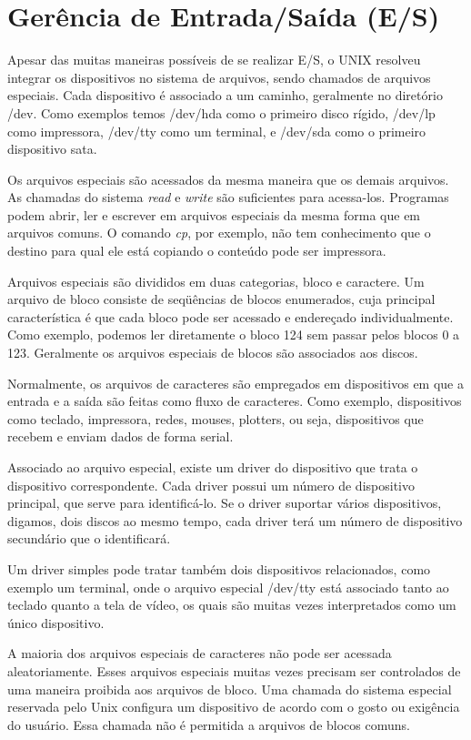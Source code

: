 \chapter{Gerência de Entrada/Saída (E/S)}

Apesar das muitas maneiras possíveis de se realizar E/S, o UNIX resolveu integrar os dispositivos no sistema de arquivos, sendo chamados de arquivos especiais. Cada dispositivo é associado a um caminho, geralmente no diretório /dev. Como exemplos temos /dev/hda como o primeiro disco rígido, /dev/lp como impressora, /dev/tty como um terminal, e /dev/sda como o primeiro dispositivo sata.

Os arquivos especiais são acessados da mesma maneira que os demais arquivos. As chamadas do sistema \emph{read} e \emph{write} são suficientes para acessa-los. Programas podem abrir, ler e escrever em arquivos especiais da mesma forma que em arquivos comuns. O comando \emph{cp}, por exemplo, não tem conhecimento que o destino para qual ele está copiando o conteúdo pode ser impressora.

Arquivos especiais são divididos em duas categorias, bloco e caractere. Um arquivo de bloco consiste de seqüências de blocos enumerados, cuja principal característica é que cada bloco pode ser acessado e endereçado individualmente. Como exemplo, podemos ler diretamente o bloco 124 sem passar pelos blocos 0 a 123. Geralmente os arquivos especiais de blocos são associados aos discos.

Normalmente, os arquivos de caracteres são empregados em dispositivos em que a entrada e a saída são feitas como fluxo de caracteres. Como exemplo, dispositivos como teclado, impressora, redes, mouses, plotters, ou seja, dispositivos que recebem e enviam dados de forma serial.

Associado ao arquivo especial, existe um driver do dispositivo que trata o dispositivo correspondente. Cada driver possui um número de dispositivo principal, que serve para identificá-lo. Se o driver suportar vários dispositivos, digamos, dois discos ao mesmo tempo, cada driver terá um número de dispositivo secundário que o identificará.

Um driver simples pode tratar também dois dispositivos relacionados, como exemplo um terminal, onde o arquivo especial /dev/tty está associado tanto ao teclado quanto a tela de vídeo, os quais são muitas vezes interpretados como um único dispositivo.

A maioria dos arquivos especiais de caracteres não pode ser acessada aleatoriamente. Esses arquivos especiais muitas vezes precisam ser controlados de uma maneira proibida aos arquivos de bloco. Uma chamada do sistema especial reservada pelo Unix configura um dispositivo de acordo com o gosto ou exigência do usuário. Essa chamada não é permitida a arquivos de blocos comuns.

